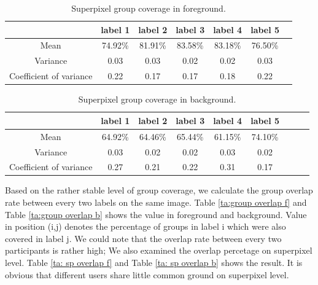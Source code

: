\documentclass[runningheads,a4paper]{llncs}
\begin{document}
\begin{table}[!tb]
\centering
\caption{Superpixel group coverage in foreground.}
\begin{tabular}{|c|c|c|c|c|c|c|}
\hline
 & label 1 & label 2&label 3&label 4&label 5\\
\hline
Mean& 74.92\% & 81.91\% & 83.58\%& 83.18\%& 76.50\%\\
\hline
Variance& 0.03 & 0.03& 0.02& 0.02& 0.03 \\
\hline
Coefficient of variance& 0.22 & 0.17 & 0.17& 0.18& 0.22 \\
\hline
\end{tabular}
\label{ta: label coverage f}
\end{table}

\begin{table}[!tb]
\centering
\caption{Superpixel group coverage in background.}
\begin{tabular}{|c|c|c|c|c|c|c|c|c|}
\hline
 & label 1 & label 2&label 3&label 4&label 5 \\
\hline
Mean& 64.92\% & 64.46\% & 65.44\%& 61.15\%& 74.10\% \\
\hline
Variance& 0.03 & 0.02 & 0.02& 0.03& 0.02 \\
\hline
Coefficient of variance& 0.27 & 0.21& 0.22& 0.31& 0.17 \\
\hline
\end{tabular}
\label{ta: label coverage b}
\end{table}


Based on the rather stable level of group coverage, we calculate the group overlap rate between every two labels on the same image. Table \ref{ta:group overlap f} and Table \ref{ta:group overlap b}  shows the value in foreground and background. Value in position (i,j) denotes the percentage of groups in label i which were also covered in label j. We could note that the overlap rate between every two participants is rather high; We also examined the overlap percetage on superpixel level. Table \ref{ta: sp overlap f} and Table \ref{ta: sp overlap b} shows the result. It is obvious that different users share little common ground on superpixel level.
\end{document}
